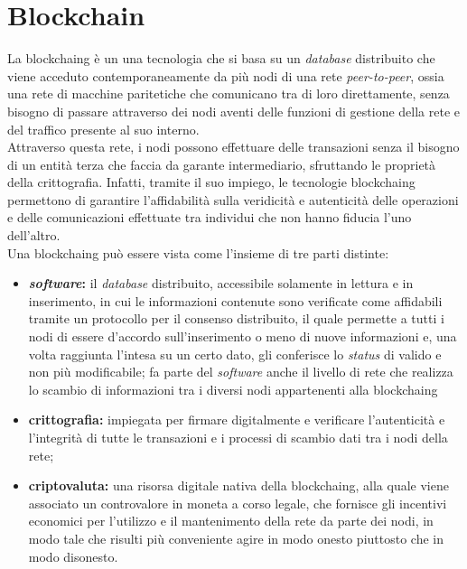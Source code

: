 
\chapter{Blockchain}
\label{cap:blockchain}

La \gls{blockchaing} è un una tecnologia che si basa su un \textit{database} distribuito che viene acceduto contemporaneamente da più nodi di una rete \textit{peer-to-peer}, ossia una rete di macchine paritetiche che comunicano tra di loro direttamente, senza bisogno di passare attraverso dei nodi aventi delle funzioni di gestione della rete e del traffico presente al suo interno.\\
Attraverso questa rete, i nodi possono effettuare delle transazioni senza il bisogno di un entità terza che faccia da garante intermediario, sfruttando le proprietà della crittografia. Infatti, tramite il suo impiego, le tecnologie \gls{blockchaing} permettono di garantire l'affidabilità sulla veridicità e autenticità delle operazioni e delle comunicazioni effettuate tra individui che non hanno fiducia l'uno dell'altro.\\
Una \gls{blockchaing} può essere vista come l'insieme di tre parti distinte:

\begin{itemize}
	\item \textbf{\textit{software}:} il \textit{database} distribuito, accessibile solamente in lettura e in inserimento, in cui le informazioni contenute sono verificate come affidabili tramite un protocollo per il consenso distribuito, il quale permette a tutti i nodi di essere d'accordo sull'inserimento o meno di nuove informazioni e, una volta raggiunta l'intesa su un certo dato, gli conferisce lo \textit{status} di valido e non più modificabile; fa parte del \textit{software} anche il livello di rete che realizza lo scambio di informazioni tra i diversi nodi appartenenti alla \gls{blockchaing}
	\item \textbf{crittografia:} impiegata per firmare digitalmente e verificare l'autenticità e l'integrità di tutte le transazioni e i processi di scambio dati tra i nodi della rete;
	\item \textbf{criptovaluta:} una risorsa digitale nativa della \gls{blockchaing}, alla quale viene associato un controvalore in moneta a corso legale, che fornisce gli incentivi economici per l'utilizzo e il mantenimento della rete da parte dei nodi, in modo tale che risulti più conveniente agire in modo onesto piuttosto che in modo disonesto.
\end{itemize}

